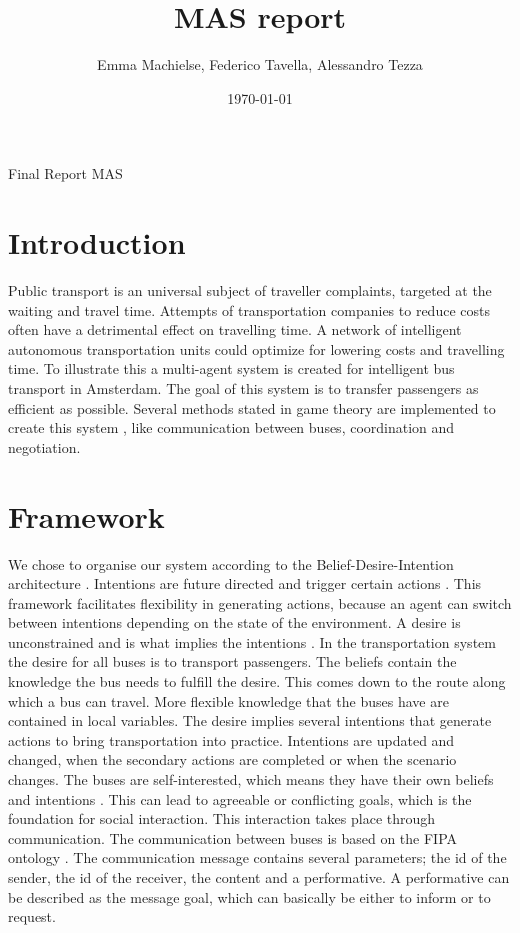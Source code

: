 \documentclass{article}
\title{MAS report}
\author{Emma Machielse, Federico Tavella, Alessandro Tezza}
\date{\today}
\begin{document}
\maketitle Final Report MAS


\section{Introduction}
Public transport is an universal subject of traveller complaints, targeted at the waiting and travel time. Attempts of transportation companies to reduce costs often have a detrimental effect on travelling time. A network of intelligent autonomous transportation units could optimize for lowering costs and travelling time. To illustrate this a multi-agent system is created for intelligent bus transport in Amsterdam. The goal of this system is to transfer passengers as efficient as possible. Several methods stated in game theory \cite{intromultiagentsystems} are implemented to create this system
, like communication between buses, coordination and negotiation. 

\section{Framework}
We chose to organise our system according to the Belief-Desire-Intention architecture \cite{caillou2017simple}. Intentions are future directed and trigger certain actions \cite{multiagentsystems}. This framework facilitates flexibility in generating actions, because an agent can switch between intentions depending on the state of the environment. 
\newline
A desire is unconstrained and is what implies the intentions \cite{multiagentsystems}. In the transportation system the desire for all buses is to transport passengers. The beliefs contain the knowledge the bus needs to fulfill the desire. This comes down to the route along which a bus can travel. More flexible knowledge that the buses have are contained in local variables. 
\newline 
The desire implies several intentions that generate actions to bring transportation into practice. Intentions are updated and changed, when the secondary actions are completed or when the scenario changes. 
\newline
The buses are self-interested, which means they have their own beliefs and intentions \cite{multiagentsystems}. This can lead to agreeable or conflicting goals, which is the foundation for social interaction. This interaction takes place through communication. The communication between buses is based on the FIPA ontology \cite{fipa}. The communication message contains several parameters; the id of the sender, the id of the receiver, the content and a performative. A performative can be described as the message goal, which can basically be either to inform or to request. 
\end{document}
